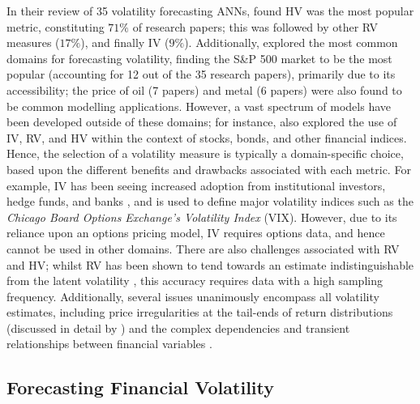 \documentclass[a4paper, 11pt]{report}
\begin{document}
    In their review of 35 volatility forecasting ANNs, \citet{ge-2022} found HV was the most popular metric, constituting $71\%$ of research papers; this was followed by other RV measures ($17\%$), and finally IV ($9\%$). Additionally, \citet{ge-2022} explored the most common domains for forecasting volatility, finding the S\&P 500 market to be the most popular (accounting for 12 out of the 35 research papers), primarily due to its accessibility; the price of oil (7 papers) and metal (6 papers) were also found to be common modelling applications. However, a vast spectrum of models have been developed outside of these domains; for instance, \citet{ge-2022} also explored the use of IV, RV, and HV within the context of stocks, bonds, and other financial indices. Hence, the selection of a volatility measure is typically a domain-specific choice, based upon the different benefits and drawbacks associated with each metric. For example, IV has been seeing increased adoption from institutional investors, hedge funds, and banks \citep{neftci-2008}, and is used to define major volatility indices such as the \emph{Chicago Board Options Exchange's Volatility Index} (VIX). However, due to its reliance upon an options pricing model, IV requires options data, and hence cannot be used in other domains. There are also challenges associated with RV and HV; whilst RV has been shown to tend towards an estimate indistinguishable from the latent volatility \citep{andersen-2001}, this accuracy requires data with a high sampling frequency. Additionally, several issues unanimously encompass all volatility estimates, including price irregularities at the tail-ends of return distributions (discussed in detail by \citet{ozbayoglu-2020}) and the complex dependencies and transient relationships between financial variables \citep{timmermann-2004}.


    \subsection{Forecasting Financial Volatility}
\end{document}
